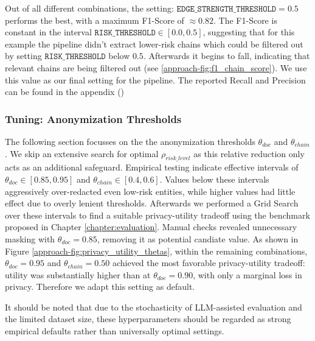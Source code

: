 Out of all different combinations, the setting: $\texttt{EDGE\_STRENGTH\_THRESHOLD} = 0.5$ performs the best, with a maximum F1-Score of $\approx 0.82$. The F1-Score is constant in the interval $\texttt{RISK\_THRESHOLD} \in [0.0,0.5]$, suggesting that for this example the pipeline didn't extract lower-risk chains which could be filtered out by setting $\texttt{RISK\_THRESHOLD}$ below $0.5$. Afterwards it begins to fall, indicating that relevant chains are being filtered out (see \ref{approach-fig:f1_chain_score}). We use this value as our final setting for the pipeline. The reported Recall and Precision can be found in the appendix () %

\subsubsection{Tuning: Anonymization Thresholds}
The following section focusses on the the anonymization thresholds $\theta_{doc}$ and $\theta_{chain}$. We skip an extensive search for optimal $\rho_{risk\_level}$ as this relative reduction only acts as an additional safeguard.
Empirical testing indicate effective intervals of $\theta_{doc}\in[0.85,0.95]$ and $\theta_{chain}\in[0.4,0.6]$. Values below these intervals aggressively over-redacted even low-risk entities, while higher values had little effect due to overly lenient thresholds. Afterwards we performed a Grid Search over these intervals to find a suitable privacy-utility tradeoff using the benchmark proposed in Chapter \ref{chapter:evaluation}. Manual checks revealed unnecessary masking with $\theta_{doc}=0.85$, removing it as potential candiate value. As shown in Figure \ref{approach-fig:privacy_utility_thetas}, within the remaining combinations, $\theta_{doc}=0.95$ and $\theta_{chain}=0.50$ achieved the most favorable privacy-utility tradeoff: utility was substantially higher than at $\theta_{doc}=0.90$, with only a marginal loss in privacy. Therefore we adapt this setting as default.

It should be noted that due to the stochasticity of LLM-assisted evaluation and the limited dataset size, these hyperparameters should be regarded as strong empirical defaults rather than universally optimal settings.


